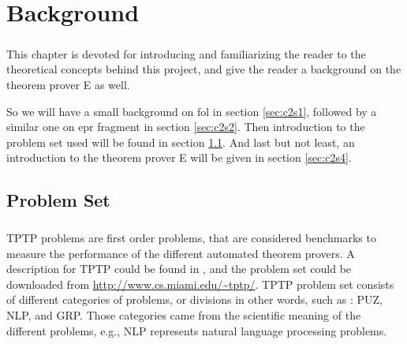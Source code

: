 \chapter{Background}\label{chap:background}

\paragraph{}
This chapter is devoted for introducing and familiarizing the reader to the theoretical concepts behind this project, and give the reader a background on the theorem prover E as well.
\begin{comment}
So it will include the following sections:
	\begin{itemize}
		\item A background on \acf{fol} in section \ref{sec:c2s1}.
		\item A background on \acf{epr} fragment in section \ref{sec:c2s2}.
		\item A background on Problem set in section \ref{sec:c2s3}.
		\item A background on E in section \ref{sec:c2s4}.
	\end{itemize}
\end{comment}


So we will have a small background on \acf{fol} in section \ref{sec:c2s1}, followed by a similar one on \acf{epr} fragment in section \ref{sec:c2s2}. Then introduction to the problem set used will be found in section \ref{sec:c2s3}. And last but not least, an introduction to the theorem prover E will be given in section \ref{sec:c2s4}.





\section{Problem Set}\label{sec:c2s3}

\paragraph{}
TPTP problems are first order problems, that are considered benchmarks to measure the performance of the different automated theorem provers. A description for TPTP could be found in \cite{TPTP09}, and the problem set could be downloaded from \url{http://www.cs.miami.edu/~tptp/}. TPTP problem set consists of different categories of problems, or divisions in other words, such as : PUZ, NLP, and GRP. Those categories came from the scientific meaning of the different problems, e.g., NLP represents natural language processing problems.


